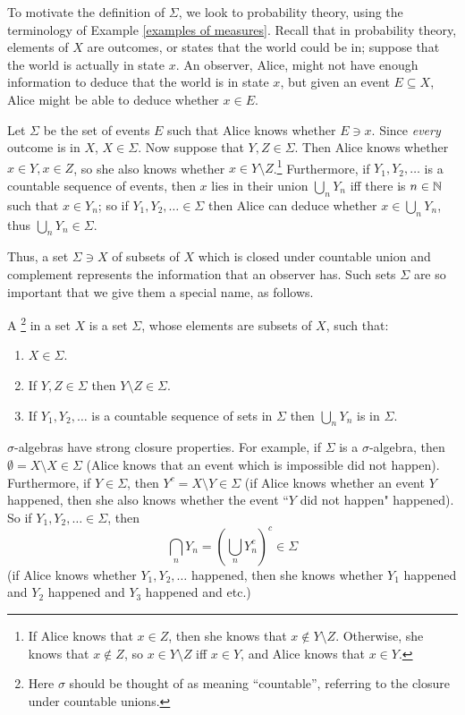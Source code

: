 \begin{subsec}
To motivate the definition of $\Sigma$, we look to probability theory, using the terminology of Example \ref{examples of measures}.
Recall that in probability theory, elements of $X$ are outcomes, or states that the world could be in; suppose that the world is actually in state $x$.
An observer, Alice, might not have enough information to deduce that the world is in state $x$, but given an event $E \subseteq X$, Alice might be able to deduce whether $x \in E$.

Let $\Sigma$ be the set of events $E$ such that Alice knows whether $E \ni x$.
Since \emph{every} outcome is in $X$, $X \in \Sigma$.
Now suppose that $Y, Z \in \Sigma$. Then Alice knows whether $x \in Y,x \in Z$, so she also knows whether $x \in Y \setminus Z$.\footnote{If Alice knows that $x \in Z$, then she knows that $x \notin Y \setminus Z$. Otherwise, she knows that $x \notin Z$, so $x \in Y \setminus Z$ iff $x \in Y$, and Alice knows that $x \in Y$.}
Furthermore, if $Y_1, Y_2, \dots$ is a countable sequence of events, then $x$ lies in their union $\bigcup_n Y_n$ iff there is $n \in \mathbb{N}$ such that $x \in Y_n$; so if $Y_1, Y_2, \dots \in \Sigma$ then Alice can deduce whether $x \in \bigcup_n Y_n$, thus $\bigcup_n Y_n \in \Sigma$.

Thus, a set $\Sigma \ni X$ of subsets of $X$ which is closed under countable union and complement represents the information that an observer has.
Such sets $\Sigma$ are so important that we give them a special name, as follows.
\end{subsec}

\begin{definition}
A \footnote{Here $\sigma$ should be thought of as meaning ``countable'', referring to the closure under countable unions.} in a set $X$ is a set $\Sigma$, whose elements are subsets of $X$, such that:
\begin{enumerate}
\item $X \in \Sigma$.
\item If $Y, Z \in \Sigma$ then $Y \setminus Z \in \Sigma$.
\item If $Y_1, Y_2, \dots$ is a countable sequence of sets in $\Sigma$ then $\bigcup_n Y_n$ is in $\Sigma$.
\end{enumerate}
\end{definition}

\begin{subsec}
$\sigma$-algebras have strong closure properties. For example, if $\Sigma$ is a $\sigma$-algebra, then $\emptyset = X \setminus X \in \Sigma$ (Alice knows that an event which is impossible did not happen).
Furthermore, if $Y \in \Sigma$, then $Y^c = X \setminus Y \in \Sigma$ (if Alice knows whether an event $Y$ happened, then she also knows whether the event ``$Y$ did not happen" happened).
So if $Y_1, Y_2, \dots \in \Sigma$, then
$$\bigcap_n Y_n = \left(\bigcup_n Y_n^c\right)^c \in \Sigma$$
(if Alice knows whether $Y_1, Y_2, \dots$ happened, then she knows whether $Y_1$ happened and $Y_2$ happened and $Y_3$ happened and etc.)
\end{subsec}

